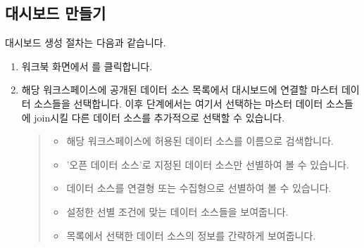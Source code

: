 \documentclass[letterpaper,10pt,english]{sphinxmanual}
\begin{document}
\subsection{대시보드 만들기}
\label{\detokenize{discovery/part04/create_a_dashboard:id1}}\label{\detokenize{discovery/part04/create_a_dashboard::doc}}
대시보드 생성 절차는 다음과 같습니다.
\begin{enumerate}
\def\theenumi{\arabic{enumi}}
\def\labelenumi{\theenumi .}
\makeatletter\def\p@enumii{\p@enumi \theenumi .}\makeatother
\item {} 
워크북 화면에서 를 클릭합니다.
\begin{quote}

\begin{figure}[H]
\centering

\noindent{}
\end{figure}
\end{quote}

\item {} 
해당 워크스페이스에 공개된 데이터 소스 목록에서 대시보드에 연결할 마스터 데이터 소스들을 선택합니다. 이후 단계에서는 여기서 선택하는 마스터 데이터 소스들에 join시킬 다른 데이터 소스를 추가적으로 선택할 수 있습니다.
\begin{quote}

\begin{figure}[H]
\centering

\noindent{}
\end{figure}
\begin{itemize}
\item {} 
 해당 워크스페이스에 허용된 데이터 소스를 이름으로 검색합니다.

\item {} 
 '오픈 데이터 소스'로 지정된 데이터 소스만 선별하여 볼 수 있습니다.

\item {} 
 데이터 소스를 연결형 또는 수집형으로 선별하여 볼 수 있습니다.

\item {} 
 설정한 선별 조건에 맞는 데이터 소스들을 보여줍니다.

\item {} 
 목록에서 선택한 데이터 소스의 정보를 간략하게 보여줍니다.


\end{itemize}
\end{quote}
\end{enumerate}
\end{document}
